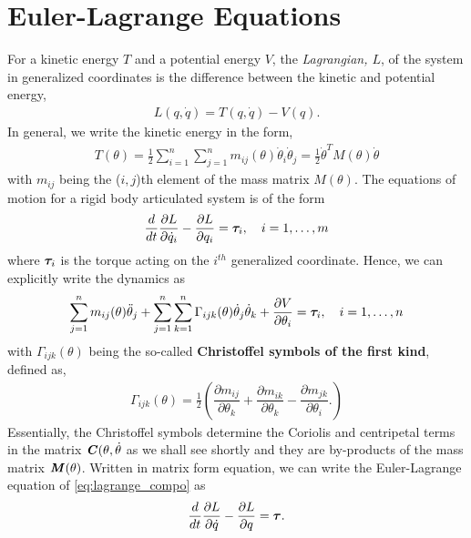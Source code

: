 \section{Euler-Lagrange Equations}
%
For a kinetic energy $T$ and a potential energy $V$, the \textit{Lagrangian, $L$}, of the system in generalized coordinates is the difference between the kinetic and potential energy, \ie
%
\begin{align}
L(q, \dot{q}) = T(q, \dot{q}) - V(q).
\label{eq:lagrange}
\end{align}
%
In general, we write the kinetic energy in the form, 
%
\begin{align}
	T(\theta) = \frac{1}{2} \sum_{i = 1}^{n} \sum_{j = 1}^{n}  m_{ij}(\theta) \dot{\theta}_i \dot{\theta}_j = \frac{1}{2} \dot{\theta}^T M(\theta) \dot{\theta}
\end{align}
% 
with $m_{ij}$ being the ($i, j$)th element of the mass matrix $M(\theta)$. 
%
The equations of motion for a rigid body articulated system is of the form
%
\begin{align}
\dfrac{d}{dt}\dfrac{\partial L}{\partial \dot{q}_i} - \dfrac{\partial L}{\partial q_i} = \bm{\tau}_i, \quad i = 1, \ldots, m
\label{eq:lagrange_compo}
\end{align}
%
where $\bm{\tau}_i$ is the torque acting on the $i^{th}$ generalized coordinate. Hence, we can explicitly write the dynamics as 
%
\begin{align}
\sum_{j=1}^{n} m_{ij}(\theta) \ddot{\theta}_j + \sum_{j = 1}^{n} \sum_{k = 1}^{n} \Gamma_{ijk}(\theta) \dot{\theta}_j \dot{\theta}_k + \dfrac{\partial V}{\partial \theta_i } = 	\bm{\tau}_i, \quad i = 1, \ldots, n
\end{align} 
%
with $\Gamma_{ijk}(\theta) $ being the so-called \textbf{Christoffel symbols of the first kind}, defined as, 
%
\begin{align}
	\Gamma_{ijk}(\theta)  = \frac{1}{2}\left(\dfrac{\partial m_{ij}}{\partial \theta_k} + \dfrac{\partial m_{ik}}{\partial \theta_k} - \dfrac{\partial m_{jk}}{\partial \theta_i}.
	\right)
\end{align}
%
Essentially, the Christoffel symbols determine the Coriolis and centripetal terms in the matrix $\textbf{\textit{C}}(\theta, \dot{\theta}$ as we shall see shortly and they are by-products of the mass matrix $\textbf{\textit{M}}(\theta)$. 
%
Written in matrix form equation, we can write the Euler-Lagrange equation of \eqref{eq:lagrange_compo} as
%
\begin{align}
\dfrac{d}{dt}\dfrac{\partial L}{\partial \dot{q}} - \dfrac{\partial L}{\partial q} = \bm{\tau}.
\label{eq:lagrange_deri}
\end{align}
